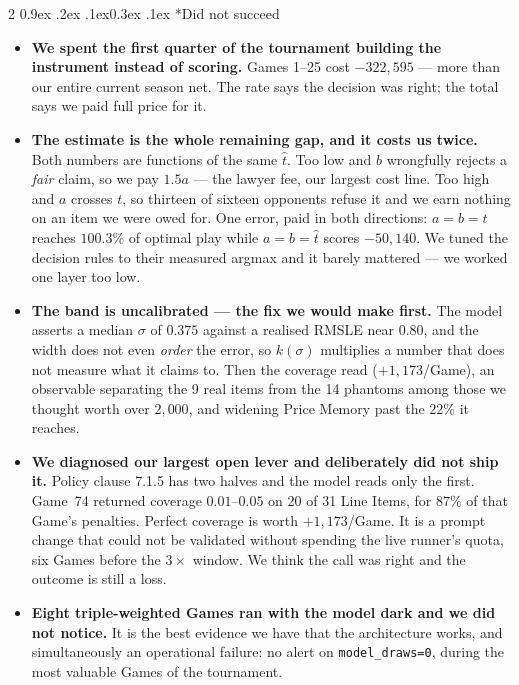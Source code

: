 \documentclass[9pt,a4paper,twocolumn]{article}
\makeatletter
\renewcommand\subsection{\@startsection{subsection}{2}{\z@}%
  {0.9ex \@plus .2ex \@minus .1ex}{0.3ex \@plus .1ex}%
  {\normalfont\small\bfseries}}
\newcommand{\charge}{a}
\newcommand{\limitv}{b}
\newcommand{\fair}{t}
\newcommand{\est}{\hat{t}}
\makeatother
\begin{document}
\begin{multicols}{2}
\subsection*{Did not succeed}
\begin{itemize}
\item \textbf{We spent the first quarter of the tournament building the instrument instead of
scoring.} Games 1--25 cost $-322{,}595$ --- more than our entire current season net. The rate says
the decision was right; the total says we paid full price for it.
\item \textbf{The estimate is the whole remaining gap, and it costs us twice.} Both numbers are
functions of the same $\est$. Too low and $\limitv$ wrongfully rejects a \emph{fair} claim, so we
pay $1.5\charge$ --- the lawyer fee, our largest cost line. Too high and $\charge$ crosses $\fair$,
so thirteen of sixteen opponents refuse it and we earn nothing on an item we were owed for. One
error, paid in both directions: $\charge{=}\limitv{=}\fair$ reaches $100.3\%$ of optimal play while
$\charge{=}\limitv{=}\est$ scores $-50{,}140$. We tuned the decision rules to their measured argmax
and it barely mattered --- we worked one layer too low.
\item \textbf{The band is uncalibrated --- the fix we would make first.} The model asserts a median
$\sigma$ of $0.375$ against a realised RMSLE near $0.80$, and the width does not even \emph{order}
the error, so $k(\sigma)$ multiplies a number that does not measure what it claims to. Then the
coverage read ($+1{,}173$/Game), an observable separating the 9 real items from the 14 phantoms
among those we thought worth over $2{,}000$, and widening Price Memory past the $22\%$ it reaches.
\item \textbf{We diagnosed our largest open lever and deliberately did not ship it.} Policy clause
7.1.5 has two halves and the model reads only the first. Game~74 returned coverage $0.01$--$0.05$
on 20 of 31 Line Items, for $87\%$ of that Game's penalties. Perfect coverage is worth
$+1{,}173$/Game. It is a prompt change that could not be validated without spending the live
runner's quota, six Games before the $3\times$ window. We think the call was right and the outcome
is still a loss.
\item \textbf{Eight triple-weighted Games ran with the model dark and we did not notice.} It is the
best evidence we have that the architecture works, and simultaneously an operational failure: no
alert on \texttt{model\_draws=0}, during the most valuable Games of the tournament.
\end{itemize}
\end{multicols}
\end{document}
